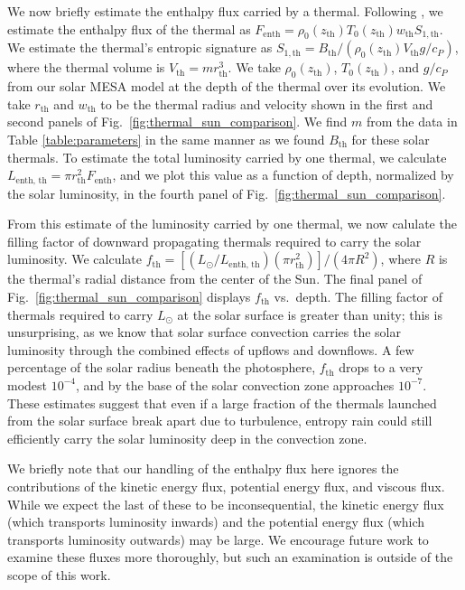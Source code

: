 We now briefly estimate the enthalpy flux carried by a thermal.
Following \cite{brandenburg2016}, we estimate the enthalpy flux of the thermal as $F_{\text{enth}} = \rho_0(z_{\text{th}}) T_0(z_{\text{th}}) w_{\text{th}} S_{1,\text{th}}$.
We estimate the thermal's entropic signature as $S_{1, \text{th}} = B_{\text{th}}/(\rho_0(z_{\text{th}}) V_{\text{th}} g/c_P)$, where the thermal volume is $V_{\text{th}} = m r_{\text{th}}^3$.
We take $\rho_0(z_{\text{th}})$, $T_0(z_{\text{th}})$, and $g/c_P$ from our solar MESA model at the depth of the thermal over its evolution.
We take $r_{\text{th}}$ and $w_{\text{th}}$ to be the thermal radius and velocity shown in the first and second panels of Fig.~\ref{fig:thermal_sun_comparison}.
We find $m$ from the data in Table \ref{table:parameters} in the same manner as we found $B_{\text{th}}$ for these solar thermals.
To estimate the total luminosity carried by one thermal, we calculate $L_{\text{enth, th}} = \pi r_{\text{th}}^2 F_{\text{enth}}$, and we plot this value as a function of depth, normalized by the solar luminosity, in the fourth panel of Fig.~\ref{fig:thermal_sun_comparison}.

From this estimate of the luminosity carried by one thermal, we now calulate the filling factor of downward propagating thermals required to carry the solar luminosity.
We calculate $f_{\text{th}} = [(L_{\odot}/L_{\text{enth, th}}) (\pi r_{\text{th}}^2)]/(4\pi R^2)$, where $R$ is the thermal's radial distance from the center of the Sun.
The final panel of Fig.~\ref{fig:thermal_sun_comparison} displays $f_{\text{th}}$ vs.~depth.
The filling factor of thermals required to carry $L_\odot$ at the solar surface is greater than unity; this is unsurprising, as we know that solar surface convection carries the solar luminosity through the combined effects of upflows and downflows.
A few percentage of the solar radius beneath the photosphere, $f_{\text{th}}$ drops to a very modest $10^{-4}$, and by the base of the solar convection zone approaches $10^{-7}$.
These estimates suggest that even if a large fraction of the thermals launched from the solar surface break apart due to turbulence, entropy rain could still efficiently carry the solar luminosity deep in the convection zone.

We briefly note that our handling of the enthalpy flux here ignores the contributions of the kinetic energy flux, potential energy flux, and viscous flux.
While we expect the last of these to be inconsequential, the kinetic energy flux (which transports luminosity inwards) and the potential energy flux (which transports luminosity outwards) may be large.
We encourage future work to examine these fluxes more thoroughly, but such an examination is outside of the scope of this work.

